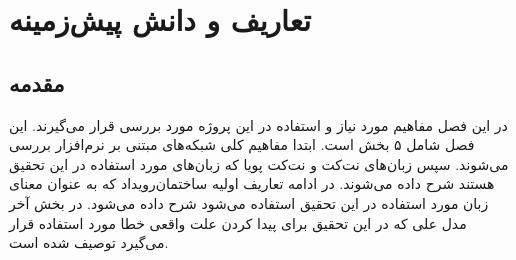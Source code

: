 \chapter{تعاریف و دانش پیش‌زمینه}
\section{مقدمه}
در این فصل مفاهیم مورد نیاز و استفاده در این پروژه مورد بررسی قرار می‌گیرند.
این فصل شامل ۵ بخش است.
ابتدا مفاهیم کلی شبکه‌های مبتنی بر نرم‌افزار بررسی می‌شوند.
سپس زبان‌های نت‌کت
و نت‌کت پویا
که زبان‌های مورد استفاده در این تحقیق هستند شرح داده می‌شوند.
در ادامه تعاریف اولیه ساختمان‌رویداد
که به عنوان معنای زبان مورد استفاده در این تحقیق استفاده می‌شود شرح داده می‌شود.
در بخش آخر مدل علی
که در این تحقیق برای پیدا کردن علت واقعی خطا مورد استفاده قرار می‌گیرد توصیف شده است.











